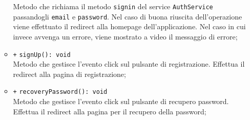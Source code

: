 \begin{itemize}
\begin{itemize}
		Metodo che richiama il metodo \texttt{signin} del service \texttt{AuthService} passandogli \texttt{email} e \texttt{password}. Nel caso di buona riuscita dell'operazione viene effettuato il redirect alla homepage dell'applicazione. Nel caso in cui invece avvenga un errore, viene mostrato a video il messaggio di errore;
		\item \texttt{+} \texttt{signUp(): void} \\
		Metodo che gestisce l'evento click sul pulsante di registrazione. Effettua il redirect alla pagina di registrazione;
		\item \texttt{+} \texttt{recoveryPassword(): void} \\
		Metodo che gestisce l'evento click sul pulsante di recupero password. Effettua il redirect alla pagina per il recupero della password; 
	\end{itemize}
\end{itemize}

